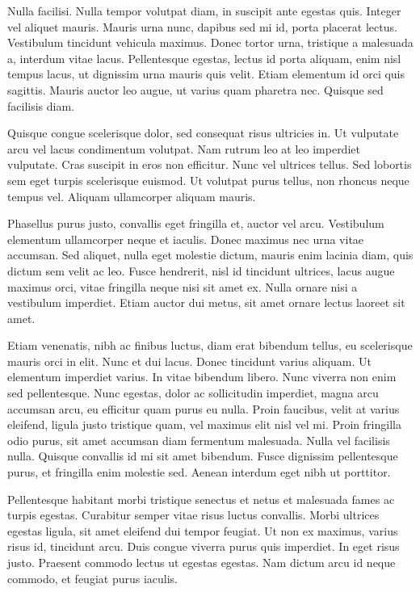 Nulla facilisi. Nulla tempor volutpat diam, in suscipit ante egestas quis. Integer vel aliquet mauris. Mauris urna nunc, dapibus sed mi id, porta placerat lectus. Vestibulum tincidunt vehicula maximus. Donec tortor urna, tristique a malesuada a, interdum vitae lacus. Pellentesque egestas, lectus id porta aliquam, enim nisl tempus lacus, ut dignissim urna mauris quis velit. Etiam elementum id orci quis sagittis. Mauris auctor leo augue, ut varius quam pharetra nec. Quisque sed facilisis diam.

Quisque congue scelerisque dolor, sed consequat risus ultricies in. Ut vulputate arcu vel lacus condimentum volutpat. Nam rutrum leo at leo imperdiet vulputate. Cras suscipit in eros non efficitur. Nunc vel ultrices tellus. Sed lobortis sem eget turpis scelerisque euismod. Ut volutpat purus tellus, non rhoncus neque tempus vel. Aliquam ullamcorper aliquam mauris.

Phasellus purus justo, convallis eget fringilla et, auctor vel arcu. Vestibulum elementum ullamcorper neque et iaculis. Donec maximus nec urna vitae accumsan. Sed aliquet, nulla eget molestie dictum, mauris enim lacinia diam, quis dictum sem velit ac leo. Fusce hendrerit, nisl id tincidunt ultrices, lacus augue maximus orci, vitae fringilla neque nisi sit amet ex. Nulla ornare nisi a vestibulum imperdiet. Etiam auctor dui metus, sit amet ornare lectus laoreet sit amet.

Etiam venenatis, nibh ac finibus luctus, diam erat bibendum tellus, eu scelerisque mauris orci in elit. Nunc et dui lacus. Donec tincidunt varius aliquam. Ut elementum imperdiet varius. In vitae bibendum libero. Nunc viverra non enim sed pellentesque. Nunc egestas, dolor ac sollicitudin imperdiet, magna arcu accumsan arcu, eu efficitur quam purus eu nulla. Proin faucibus, velit at varius eleifend, ligula justo tristique quam, vel maximus elit nisl vel mi. Proin fringilla odio purus, sit amet accumsan diam fermentum malesuada. Nulla vel facilisis nulla. Quisque convallis id mi sit amet bibendum. Fusce dignissim pellentesque purus, et fringilla enim molestie sed. Aenean interdum eget nibh ut porttitor.

Pellentesque habitant morbi tristique senectus et netus et malesuada fames ac turpis egestas. Curabitur semper vitae risus luctus convallis. Morbi ultrices egestas ligula, sit amet eleifend dui tempor feugiat. Ut non ex maximus, varius risus id, tincidunt arcu. Duis congue viverra purus quis imperdiet. In eget risus justo. Praesent commodo lectus ut egestas egestas. Nam dictum arcu id neque commodo, et feugiat purus iaculis.

